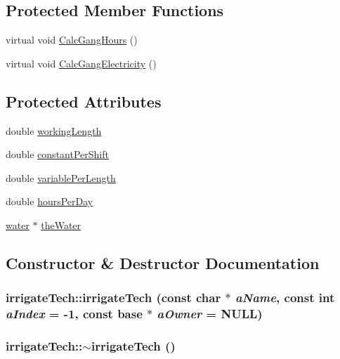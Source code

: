 \subsection*{Protected Member Functions}
\begin{DoxyCompactItemize}
\item 
virtual void \hyperlink{classirrigate_tech_a936cb4d45c7ae68deaa04ce5d9397dbe}{CalcGangHours} ()
\item 
virtual void \hyperlink{classirrigate_tech_aff9f1aa84dc7255d893012191ac232f4}{CalcGangElectricity} ()
\end{DoxyCompactItemize}
\subsection*{Protected Attributes}
\begin{DoxyCompactItemize}
\item 
double \hyperlink{classirrigate_tech_ada1989252be32c06c3f61e5413012efd}{workingLength}
\item 
double \hyperlink{classirrigate_tech_ac0791878396871b90eea5fdcc5c8b9f8}{constantPerShift}
\item 
double \hyperlink{classirrigate_tech_a52efb2478036767847d634779f039c9d}{variablePerLength}
\item 
double \hyperlink{classirrigate_tech_aee8b8e08f7b55f4961240de7f5735b08}{hoursPerDay}
\item 
\hyperlink{classwater}{water} $\ast$ \hyperlink{classirrigate_tech_a8b2c236b29c9694cfc58c119dcc3466b}{theWater}
\end{DoxyCompactItemize}


\subsection{Constructor \& Destructor Documentation}
\hypertarget{classirrigate_tech_a2a3114ef17127272f1b30d7e50404f34}{
\subsubsection[{irrigateTech}]{\setlength{\rightskip}{0pt plus 5cm}irrigateTech::irrigateTech (const char $\ast$ {\em aName}, \/  const int {\em aIndex} = {\ttfamily -\/1}, \/  const {\bf base} $\ast$ {\em aOwner} = {\ttfamily NULL})}}
\label{classirrigate_tech_a2a3114ef17127272f1b30d7e50404f34}
\hypertarget{classirrigate_tech_a54d46070621b3e40e31c8737626b9ba7}{
\subsubsection[{$\sim$irrigateTech}]{\setlength{\rightskip}{0pt plus 5cm}irrigateTech::$\sim$irrigateTech ()}}
\label{classirrigate_tech_a54d46070621b3e40e31c8737626b9ba7}


